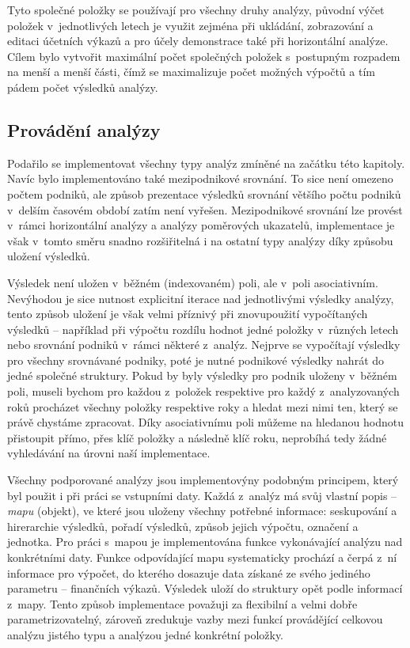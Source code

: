 Tyto společné položky se používají pro všechny druhy analýzy, původní výčet položek v~jednotlivých letech je využit zejména při ukládání, zobrazování a editaci účetních výkazů a pro účely demonstrace také při horizontální analýze. Cílem bylo vytvořit maximální počet společných položek s~postupným rozpadem na menší a menší části, čímž se maximalizuje počet možných výpočtů a tím pádem počet výsledků analýzy.


\subsection{Provádění analýzy}
Podařilo se implementovat všechny typy analýz zmíněné na začátku této kapitoly. Navíc bylo implementováno také mezipodnikové srovnání. To sice není omezeno počtem podniků, ale způsob prezentace výsledků srovnání většího počtu podniků v~delším časovém období zatím není vyřešen. Mezipodnikové srovnání lze provést v~rámci horizontální analýzy a analýzy poměrových ukazatelů, implementace je však v~tomto směru snadno rozšiřitelná i na ostatní typy analýzy díky způsobu uložení výsledků.

Výsledek není uložen v~běžném (indexovaném) poli, ale v~poli asociativním. Nevýhodou je sice nutnost explicitní iterace nad jednotlivými výsledky analýzy, tento způsob uložení je však velmi příznivý při znovupoužití vypočítaných výsledků -- například při výpočtu rozdílu hodnot jedné položky v~různých letech nebo srovnání podniků v~rámci některé z~analýz. Nejprve se vypočítají výsledky pro všechny srovnávané podniky, poté je nutné podnikové výsledky nahrát do jedné společné struktury. Pokud by byly výsledky pro podnik uloženy v~běžném poli, museli bychom pro každou z~položek respektive pro každý z~analyzovaných roků procházet všechny položky respektive roky a hledat mezi nimi ten, který se právě chystáme zpracovat. Díky asociativnímu poli můžeme na hledanou hodnotu přistoupit přímo, přes klíč položky a následně klíč roku, neprobíhá tedy žádné vyhledávání na úrovni naší implementace.

Všechny podporované analýzy jsou implementovýny podobným principem, který byl použit i při práci se vstupními daty. Každá z~analýz má svůj vlastní popis -- \textit{mapu} (objekt), ve které jsou uloženy všechny potřebné informace: seskupování a hirerarchie výsledků, pořadí výsledků, způsob jejich výpočtu, označení a jednotka. Pro práci s~mapou je implementována funkce vykonávající analýzu nad konkrétními daty. Funkce odpovídající mapu systematicky prochází a čerpá z~ní informace pro výpočet, do kterého dosazuje data získané ze svého jediného parametru -- finančních výkazů. Výsledek uloží do struktury opět podle informací z~mapy. Tento způsob implementace považuji za flexibilní a velmi dobře parametrizovatelný, zároveň zredukuje vazby mezi funkcí provádějící celkovou analýzu jistého typu a analýzou jedné konkrétní položky.


